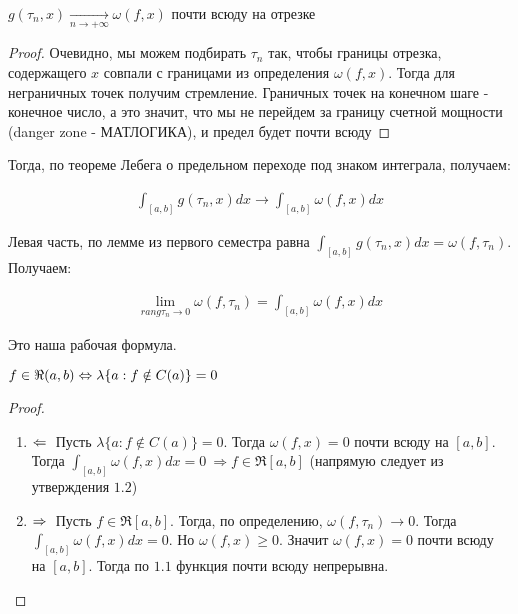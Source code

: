 \begin{statement}
$g(\tau_n, x) \xrightarrow[n \rightarrow +\infty]{} \omega(f, x)$ почти всюду на отрезке
\end{statement}

\begin{proof}
    Очевидно, мы можем подбирать $\tau_n$ так, чтобы границы отрезка, содержащего $x$
    совпали с границами из определения $\omega(f,x)$. Тогда для неграничных точек получим стремление. 
    Граничных точек на конечном шаге - конечное число, а это значит, что мы не перейдем за границу счетной 
    мощности (danger zone - МАТЛОГИКА), и предел будет почти всюду 
\end{proof}

Тогда, по теореме Лебега о предельном переходе под знаком интеграла, получаем:

\begin{gather*}
    \int_{[a, b]}g(\tau_n, x)dx \rightarrow \int_{[a,b]}\omega(f,x)dx
\end{gather*}

Левая часть, по лемме из первого семестра равна $\int_{[a, b]}g(\tau_n, x)dx = \omega(f, \tau_n)$.
Получаем:

\begin{gather*}
    \lim_{rang\tau_n \rightarrow 0} \omega(f, \tau_n) = \int_{[a,b]} \omega(f,x)dx
\end{gather*}

Это наша рабочая формула.

\begin{theorem}
    $\\ f \in \Re (a, b) \Leftrightarrow \lambda\{ a : f \notin C(a) \} = 0$
\end{theorem}

\begin{proof}
	\begin{enumerate}
		\item 
			$\Leftarrow \\$ Пусть $\lambda\{ a : f \notin C(a) \} = 0$. Тогда $\omega(f,x) = 0$ почти всюду на $[a, b]$.
            Тогда $\int_{[a,b]} \omega(f, x)dx = 0 \: \Rightarrow f \in \Re [a,b]$ (напрямую следует из утверждения $1.2$) 
		\item 
			$\Rightarrow \\$ Пусть $f \in \Re [a, b]$. Тогда, по определению, $\omega(f, \tau_n) \rightarrow 0$. 
            Тогда $\int_{[a,b]} \omega(f, x)dx = 0$. Но $\omega(f, x) \geqslant 0$. 
            Значит $\omega(f,x) = 0$ почти всюду на $[a,b]$. Тогда по $1.1$ функция почти всюду непрерывна. \qedhere
	\end{enumerate}
\end{proof}


